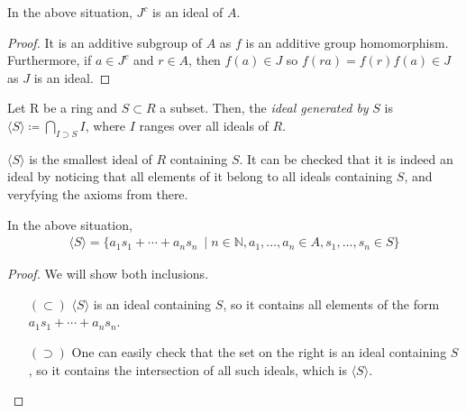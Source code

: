         \begin{prop}
            In the above situation, $J^{c}$ is an ideal of $A$.
        \end{prop}

            \begin{proof}
                It is an additive subgroup of $A$ as $f$ is an additive group homomorphism.
                Furthermore, if $a \in J^{c}$ and $r \in A$, then $f(a) \in J$ so $f(ra) = f(r)f(a) \in J$ as $J$ is an ideal.
            \end{proof}

        \begin{defn}
            Let R be a ring and $S \subset R$ a subset.
            Then, the \emph{ideal generated by} $S$ is $\langle S \rangle \coloneqq \bigcap_{I \supset S} I$, where $I$ ranges over all ideals of $R$.
        \end{defn}

        \begin{rk}
            $\langle S \rangle$ is the smallest ideal of $R$ containing $S$.
            It can be checked that it is indeed an ideal by noticing that all elements of it belong to all ideals containing $S$,
            and veryfying the axioms from there.
        \end{rk}

        \begin{prop}
            In the above situation,
            \begin{align}
                \langle S \rangle = \{a_1 s_1 + \cdots + a_n s_n\ \mid n \in \mathbb{N}, a_1, \ldots, a_n \in A, s_1, \ldots, s_n \in S\} \nonumber
            \end{align}
        \end{prop}

            \begin{proof}
                We will show both inclusions.
                \begin{itemize}
                    \item[$(\subset)$] $\langle S \rangle$ is an ideal containing $S$, so it contains all elements of the form $a_1 s_1 + \cdots + a_n s_n$.
                    \item[$(\supset)$] One can easily check that the set on the right is an ideal containing $S$,
                    so it contains the intersection of all such ideals, which is $\langle S \rangle$.
                \end{itemize}
            \end{proof}

